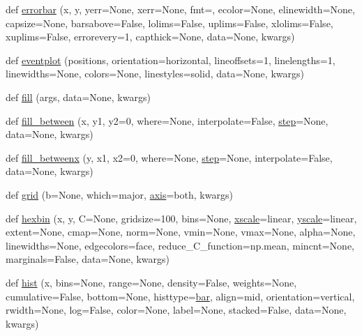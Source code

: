 \begin{DoxyCompactItemize}
\item 
def \hyperlink{namespacematplotlib_1_1pyplot_a29f39a08a0156f1ad916c9a6d5092fbc}{errorbar} (x, y, yerr=None, xerr=None, fmt=\textquotesingle{}\textquotesingle{}, ecolor=None, elinewidth=None, capsize=None, barsabove=False, lolims=False, uplims=False, xlolims=False, xuplims=False, errorevery=1, capthick=None, data=None, kwargs)
\item 
def \hyperlink{namespacematplotlib_1_1pyplot_a977ce9a1ce5c5bc0f8c5dca5d7c57d4d}{eventplot} (positions, orientation=\textquotesingle{}horizontal\textquotesingle{}, lineoffsets=1, linelengths=1, linewidths=None, colors=None, linestyles=\textquotesingle{}solid\textquotesingle{}, data=None, kwargs)
\item 
def \hyperlink{namespacematplotlib_1_1pyplot_a75e31f548b55de2ff4b4fb303d16fbc6}{fill} (args, data=None, kwargs)
\item 
def \hyperlink{namespacematplotlib_1_1pyplot_a71d76ed8e5931ba2ba1d82611a18758f}{fill\+\_\+between} (x, y1, y2=0, where=None, interpolate=False, \hyperlink{namespacematplotlib_1_1pyplot_aca542311792dd05bf78c09dcfcb72ca0}{step}=None, data=None, kwargs)
\item 
def \hyperlink{namespacematplotlib_1_1pyplot_a426a6d3a4e80e29beca491650b007090}{fill\+\_\+betweenx} (y, x1, x2=0, where=None, \hyperlink{namespacematplotlib_1_1pyplot_aca542311792dd05bf78c09dcfcb72ca0}{step}=None, interpolate=False, data=None, kwargs)
\item 
def \hyperlink{namespacematplotlib_1_1pyplot_a0031f0295258d90d9d288eab3f0e4281}{grid} (b=None, which=\textquotesingle{}major\textquotesingle{}, \hyperlink{namespacematplotlib_1_1pyplot_a491a6aa585ceb1955264031156654647}{axis}=\textquotesingle{}both\textquotesingle{}, kwargs)
\item 
def \hyperlink{namespacematplotlib_1_1pyplot_ac4cea4c219a7a4c6eabff8fd502472a5}{hexbin} (x, y, C=None, gridsize=100, bins=None, \hyperlink{namespacematplotlib_1_1pyplot_a6d54552b1357cca77dacd8a7b8eb1b0a}{xscale}=\textquotesingle{}linear\textquotesingle{}, \hyperlink{namespacematplotlib_1_1pyplot_a26a4b4e682d9f4e53bd5f011336312a6}{yscale}=\textquotesingle{}linear\textquotesingle{}, extent=None, cmap=None, norm=None, vmin=None, vmax=None, alpha=None, linewidths=None, edgecolors=\textquotesingle{}face\textquotesingle{}, reduce\+\_\+\+C\+\_\+function=np.\+mean, mincnt=None, marginals=False, data=None, kwargs)
\item 
def \hyperlink{namespacematplotlib_1_1pyplot_af5293d65a9cf1343949501230e2d161e}{hist} (x, bins=None, range=None, density=False, weights=None, cumulative=False, bottom=None, histtype=\textquotesingle{}\hyperlink{namespacematplotlib_1_1pyplot_ad38194863cb71209db712be324411404}{bar}\textquotesingle{}, align=\textquotesingle{}mid\textquotesingle{}, orientation=\textquotesingle{}vertical\textquotesingle{}, rwidth=None, log=False, color=None, label=None, stacked=False, data=None, kwargs)

\end{DoxyCompactItemize}
